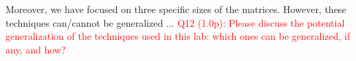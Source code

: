 \documentclass[11pt]{article}
\newcommand \question[1]{\textcolor{red}{#1}}
\begin{document}
Moreover, we have focused on three specific sizes of the matrices. However, these techniques can/cannot be generalized ... 
\question{Q12 (1.0p): Please discuss the potential generalization of the techniques used in this lab: which ones can be generalized, if any, and how?} 

\appendix



%
% 
\end{document}

